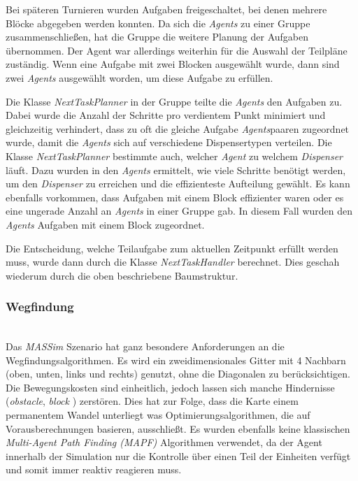 Bei späteren Turnieren wurden Aufgaben freigeschaltet, bei denen mehrere Blöcke abgegeben werden konnten. Da sich die \textit{Agents} zu einer Gruppe zusammenschließen, hat die Gruppe die weitere Planung der Aufgaben übernommen. Der Agent war allerdings weiterhin für die Auswahl der Teilpläne zuständig.
Wenn eine Aufgabe mit zwei Blocken ausgewählt wurde, dann sind zwei \textit{Agents} ausgewählt worden, um diese Aufgabe zu erfüllen. 

Die Klasse \textit{NextTaskPlanner} in der Gruppe teilte die \textit{Agents} den Aufgaben zu. Dabei wurde die Anzahl der Schritte pro verdientem Punkt minimiert und gleichzeitig verhindert, dass zu oft die gleiche Aufgabe \textit{Agents}paaren zugeordnet wurde, damit die \textit{Agents} sich auf verschiedene Dispensertypen verteilen. Die Klasse \textit{NextTaskPlanner} bestimmte auch, welcher \textit{Agent} zu welchem \textit{Dispenser} läuft. Dazu wurden in den \textit{Agents} ermittelt, wie viele Schritte benötigt werden, um den \textit{Dispenser} zu erreichen und die effizienteste Aufteilung gewählt.
Es kann ebenfalls vorkommen, dass Aufgaben mit einem Block effizienter waren oder es eine ungerade Anzahl an \textit{Agents} in einer Gruppe gab. In diesem Fall wurden den \textit{Agents} Aufgaben mit einem Block zugeordnet.

Die Entscheidung, welche Teilaufgabe zum aktuellen Zeitpunkt erfüllt werden muss, wurde dann durch die Klasse \textit{NextTaskHandler} berechnet. Dies geschah wiederum durch die oben beschriebene Baumstruktur. 

\subsubsection{Wegfindung} \label{kap:wegfindung} ~\\
Das \textit{MASSim} Szenario hat ganz besondere Anforderungen an die Wegfindungsalgorithmen. Es wird ein zweidimensionales Gitter mit 4 Nachbarn (oben, unten, links und rechts) genutzt, ohne die Diagonalen zu berücksichtigen. Die Bewegungskosten sind einheitlich, jedoch lassen sich manche Hindernisse (\textit{obstacle}, \textit{block} ) zerstören. Dies hat zur Folge, dass die Karte einem permanentem Wandel unterliegt was Optimierungsalgorithmen, die auf Vorausberechnungen basieren, ausschließt. Es wurden ebenfalls keine klassischen \textit{Multi-Agent Path Finding (MAPF)} Algorithmen verwendet, da der Agent innerhalb der Simulation nur die Kontrolle über einen Teil der Einheiten verfügt und somit immer reaktiv reagieren muss. \\

